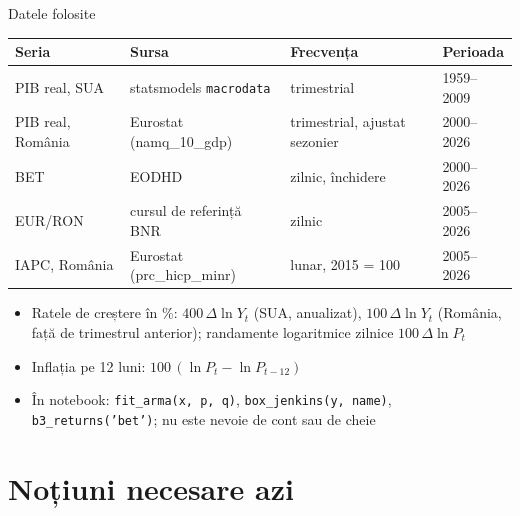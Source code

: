 \begin{frame}{Datele folosite}
\itemsize{\small}
\begin{center}
\footnotesize
\begin{tabular}{llll}
\toprule
\textbf{Seria} & \textbf{Sursa} & \textbf{Frecvența} & \textbf{Perioada} \\
\midrule
PIB real, SUA & statsmodels \texttt{macrodata} & trimestrial & 1959--2009 \\
PIB real, România & Eurostat (namq\_10\_gdp) & trimestrial, ajustat sezonier & 2000--2026 \\
BET & EODHD & zilnic, închidere & 2000--2026 \\
EUR/RON & cursul de referință BNR & zilnic & 2005--2026 \\
IAPC, România & Eurostat (prc\_hicp\_minr) & lunar, 2015 = 100 & 2005--2026 \\
\bottomrule
\end{tabular}
\end{center}
\begin{itemize}
    \item Ratele de creștere în \%: $400\,\Delta\ln Y_t$ (SUA, anualizat), $100\,\Delta\ln Y_t$ (România, față de trimestrul anterior); randamente logaritmice zilnice $100\,\Delta\ln P_t$
    \item Inflația pe 12 luni: $100\,(\ln P_t - \ln P_{t-12})$
    \item În notebook: \texttt{fit\_arma(x, p, q)}, \texttt{box\_jenkins(y, name)}, \texttt{b3\_returns('bet')}; nu este nevoie de cont sau de cheie
\end{itemize}
\end{frame}


\section{Noțiuni necesare azi}

